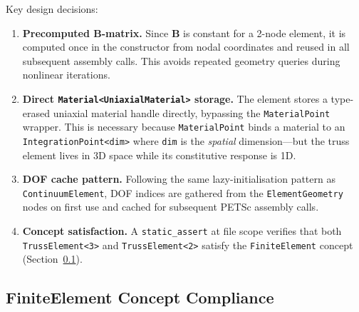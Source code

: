\noindent Key design decisions:

\begin{enumerate}
    \item \textbf{Precomputed B-matrix.}  Since $\mathbf{B}$ is constant
          for a 2-node element, it is computed once in the constructor from
          nodal coordinates and reused in all subsequent assembly calls.
          This avoids repeated geometry queries during nonlinear iterations.

    \item \textbf{Direct \texttt{Material<UniaxialMaterial>} storage.}  The
          element stores a type-erased uniaxial material handle
          directly, bypassing the \texttt{MaterialPoint} wrapper.  This is
          necessary because \texttt{MaterialPoint} binds a material to an
          \texttt{IntegrationPoint<dim>} where \texttt{dim} is the
          \emph{spatial} dimension---but the truss element lives in 3D
          space while its constitutive response is 1D.

    \item \textbf{DOF cache pattern.}  Following the same lazy-initialisation
          pattern as \texttt{ContinuumElement}, DOF indices are gathered from
          the \texttt{ElementGeometry} nodes on first use and cached for
          subsequent PETSc assembly calls.

    \item \textbf{Concept satisfaction.}  A \texttt{static\_assert} at
          file scope verifies that both \texttt{TrussElement<3>} and
          \texttt{TrussElement<2>} satisfy the \texttt{FiniteElement}
          concept (Section~\ref{sec:truss-concept}).
\end{enumerate}


\subsection{FiniteElement Concept Compliance}
\label{sec:truss-concept}

